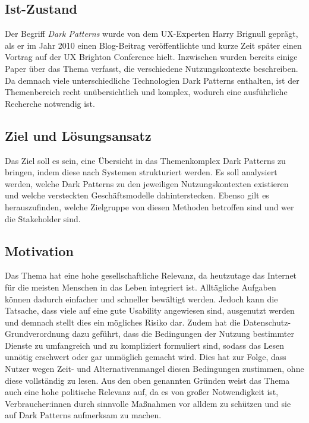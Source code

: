 \documentclass[a4paper]{article}
\begin{document}
\subsection{Ist-Zustand}
\label{sub:ist-zustand}
Der Begriff \textit{Dark Patterns} wurde von dem UX-Experten Harry Brignull geprägt, als er im Jahr 2010 einen Blog-Beitrag veröffentlichte \cite{brignull1} und kurze Zeit später einen Vortrag auf der UX Brighton Conference hielt. Inzwischen wurden bereits einige Paper über das Thema verfasst, die verschiedene Nutzungskontexte beschreiben. Da demnach viele unterschiedliche Technologien Dark Patterns enthalten, ist der Themenbereich recht unübersichtlich und komplex, wodurch eine ausführliche Recherche notwendig ist.

\subsection{Ziel und Lösungsansatz}
\label{sub:ziel_und_loesungsansatz}
Das Ziel soll es sein, eine Übersicht in das Themenkomplex Dark Patterns zu bringen, indem diese nach Systemen strukturiert werden. Es soll analysiert werden, welche Dark Patterns zu den jeweiligen Nutzungskontexten existieren und welche versteckten Geschäftsmodelle dahinterstecken. Ebenso gilt es herauszufinden, welche Zielgruppe von diesen Methoden betroffen sind und wer die Stakeholder sind. 

\subsection{Motivation}
\label{motivation}
Das Thema hat eine hohe gesellschaftliche Relevanz, da heutzutage das Internet für die meisten Menschen in das Leben integriert ist. Alltägliche Aufgaben können dadurch einfacher und schneller bewältigt werden. Jedoch kann die Tatsache, dass viele auf eine gute Usability angewiesen sind, ausgenutzt werden und demnach stellt dies ein mögliches Risiko dar. 
Zudem hat die Datenschutz-Grundverordnung dazu geführt, dass die Bedingungen der Nutzung bestimmter Dienste zu umfangreich und zu kompliziert formuliert sind, sodass das Lesen unnötig erschwert oder gar unmöglich gemacht wird. Dies hat zur Folge, dass Nutzer wegen Zeit- und Alternativenmangel diesen Bedingungen zustimmen, ohne diese vollständig zu lesen.  
Aus den oben genannten Gründen weist das Thema auch eine hohe politische Relevanz auf, da es von großer Notwendigkeit ist, Verbraucher:innen durch sinnvolle Maßnahmen vor alldem zu schützen und sie auf Dark Patterns aufmerksam zu machen.
\end{document}
